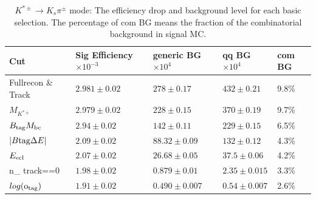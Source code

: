 \begin{table}[ht]
 \small
\begin{center}
\begin{tabular}{ |p{2.2cm}||p{3.6cm}||p{2.8cm}||p{2.1cm}||p{1.3cm}|| }
 \hline
 Cut& Sig Efficiency$\times10^{-3}$  & generic BG$\times10^{4}$&qq BG$\times10^{4}$& com BG \\
\hline
\hline
  Fullrecon \& Track 			& $2.981 \pm 0.02$ 	& $ 278 \pm 0.17$ 	&  $ 432 \pm 0.21$& 9.8\% \\ %
 \hline
  $  M_{K^{* \pm}}  $  				& $2.979 \pm 0.02$  	& $ 228 \pm 0.15$	& $ 370 \pm 0.19$ & 9.7\%\\ %
  \hline
 $B_{\rm{tag}}M_{\rm{bc}} $  			& $2.94 \pm 0.02$ 	& $ 142 \pm 0.11$	 & $ 229 \pm 0.15$ &6.5\%\\ %
 \hline
 $ | B{\rm{tag}}\Delta E | $  			& $2.09 \pm 0.02$	& $88.32\pm 0.09$	& $132\pm 0.12$ &4.3\%\\ %
 \hline
 $E_{\rm{ecl}} $				& $2.07 \pm 0.02$	& $26.68\pm 0.05$	& $37.5\pm 0.06$ &4.2\%\\ %
 \hline
 n\_ track==0 					& $1.98 \pm 0.02$	&$0.879\pm 0.01 $	& $2.35\pm 0.015$  &3.3\%\\ %
 \hline		
$log(\rm{o_{tag}})$ 				& $1.91 \pm 0.02$	&$0.490\pm 0.007$ 	& $0.54\pm 0.007$ &2.6\% \\ %
 \hline
\end{tabular}
\caption{$K^{*\pm} \rightarrow K_s \pi^\pm$ mode: The efficiency drop and background level for each basic selection. The percentage of com BG means the fraction of the combinatorial background in signal MC. } \label{t:efficiency_kspi}
\end{center}
\end{table}

